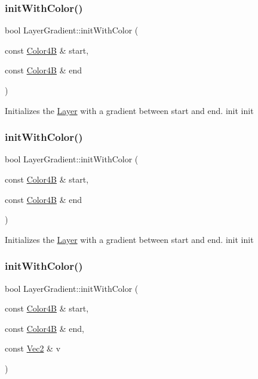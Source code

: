 \subsubsection{\texorpdfstring{init\+With\+Color()}{initWithColor()}\hspace{0.1cm}{\footnotesize\ttfamily [1/4]}}
{\footnotesize\ttfamily bool Layer\+Gradient\+::init\+With\+Color (\begin{DoxyParamCaption}\item[{const \hyperlink{structColor4B}{Color4B} \&}]{start,  }\item[{const \hyperlink{structColor4B}{Color4B} \&}]{end }\end{DoxyParamCaption})}

Initializes the \hyperlink{classLayer}{Layer} with a gradient between start and end.  init  init \mbox{\label{classLayerGradient_a4525eb8334b09187ffcf99ece5b5b9e8}} 
\subsubsection{\texorpdfstring{init\+With\+Color()}{initWithColor()}\hspace{0.1cm}{\footnotesize\ttfamily [2/4]}}
{\footnotesize\ttfamily bool Layer\+Gradient\+::init\+With\+Color (\begin{DoxyParamCaption}\item[{const \hyperlink{structColor4B}{Color4B} \&}]{start,  }\item[{const \hyperlink{structColor4B}{Color4B} \&}]{end }\end{DoxyParamCaption})}

Initializes the \hyperlink{classLayer}{Layer} with a gradient between start and end.  init  init \mbox{\label{classLayerGradient_abd19450a8badd0016dabdb6c3cf96f59}} 
\subsubsection{\texorpdfstring{init\+With\+Color()}{initWithColor()}\hspace{0.1cm}{\footnotesize\ttfamily [3/4]}}
{\footnotesize\ttfamily bool Layer\+Gradient\+::init\+With\+Color (\begin{DoxyParamCaption}\item[{const \hyperlink{structColor4B}{Color4B} \&}]{start,  }\item[{const \hyperlink{structColor4B}{Color4B} \&}]{end,  }\item[{const \hyperlink{classVec2}{Vec2} \&}]{v }\end{DoxyParamCaption})}


